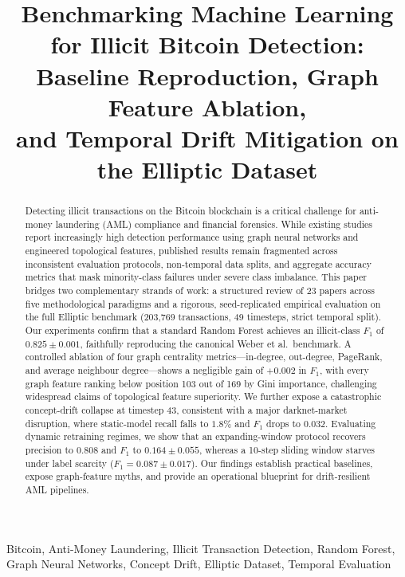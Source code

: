 \documentclass[conference]{IEEEtran}
\title{Benchmarking Machine Learning for Illicit Bitcoin Detection:\\
Baseline Reproduction, Graph Feature Ablation,\\and Temporal Drift Mitigation on the Elliptic Dataset}
\author{
  \IEEEauthorblockN{Krishika Jain \quad Saanvi [Last Name]}
  \IEEEauthorblockA{Department of [Department Name]\\
    [Institution Name], [City, Country]\\
    \{[email1], [email2]\}@[institution].edu}
}
\begin{document}
\maketitle

\begin{abstract}
Detecting illicit transactions on the Bitcoin blockchain is a critical
challenge for anti-money laundering (AML) compliance and financial
forensics. While existing studies report increasingly high detection
performance using graph neural networks and engineered topological features,
published results remain fragmented across inconsistent evaluation protocols,
non-temporal data splits, and aggregate accuracy metrics that mask
minority-class failures under severe class imbalance.
This paper bridges two complementary strands of work: a structured review
of 23 papers across five methodological paradigms and a rigorous,
seed-replicated empirical evaluation on the full Elliptic benchmark
(203,769 transactions, 49 timesteps, strict temporal split).
Our experiments confirm that a standard Random Forest achieves an
illicit-class $F_1$ of $0.825 \pm 0.001$, faithfully reproducing the
canonical Weber et al.\ benchmark.
A controlled ablation of four graph centrality metrics---in-degree,
out-degree, PageRank, and average neighbour degree---shows a negligible
gain of $+0.002$ in $F_1$, with every graph feature ranking below position
103 out of 169 by Gini importance, challenging widespread claims of
topological feature superiority.
We further expose a catastrophic concept-drift collapse at timestep 43,
consistent with a major darknet-market disruption, where static-model recall
falls to $1.8\%$ and $F_1$ drops to $0.032$.
Evaluating dynamic retraining regimes, we show that an expanding-window
protocol recovers precision to $0.808$ and $F_1$ to $0.164 \pm 0.055$,
whereas a 10-step sliding window starves under label scarcity
($F_1 = 0.087 \pm 0.017$).
Our findings establish practical baselines, expose graph-feature myths,
and provide an operational blueprint for drift-resilient AML pipelines.
\end{abstract}

\begin{IEEEkeywords}
Bitcoin, Anti-Money Laundering, Illicit Transaction Detection, Random Forest,
Graph Neural Networks, Concept Drift, Elliptic Dataset, Temporal Evaluation
\end{IEEEkeywords}

\end{document}

